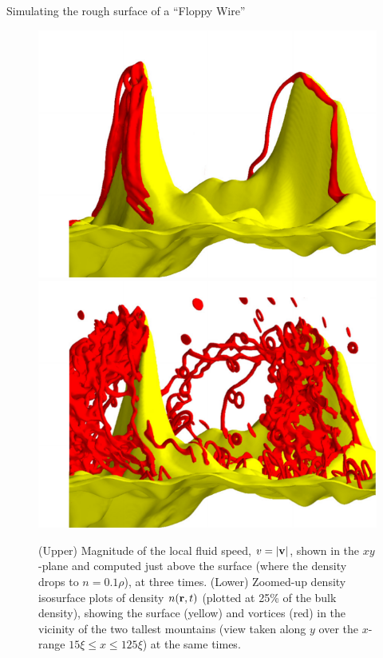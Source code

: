 \begin{chapter}{\label{cha:afm}Simulating the rough surface of a ``Floppy Wire''}
\begin{figure}
{\begin{minipage}{1.1\textwidth}
  \includegraphics[width=0.3\linewidth]{./afm/afm-sub-3101}
  \includegraphics[width=0.3\linewidth]{./afm/afm-sub-10101}
  \end{minipage}
  }
  \caption{\label{fig:velsandvorts}(Upper) Magnitude of the local fluid speed, $v=|{\bf v}|$, shown in the $xy$-plane and computed just above the surface (where the
density drops to $n=0.1 \rho$), at three times.  (Lower) Zoomed-up density isosurface plots of density $n({\bf r},t)$ (plotted at 25\%  of the bulk density), showing the surface (yellow) and vortices (red) in the vicinity of the two tallest mountains (view taken along $y$ over the $x$-range $15 \xi \leq x \leq 125 \xi$) at the same times.  %
}
 \end{figure} 


\end{chapter}
